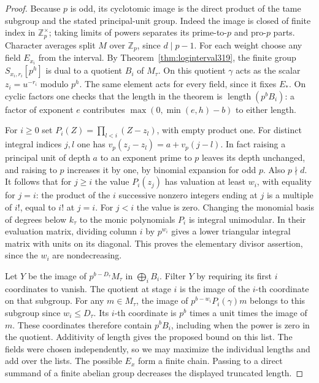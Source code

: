 \documentclass[a4paper,11pt]{article}
\theoremstyle{definition}
\theoremstyle{remark}
\newcommand{\ZZ}{\mathbb Z}\newcommand{\ord}{\operatorname{ord}}
\newcommand{\len}{\operatorname{length}}\newcommand{\Res}{\operatorname*{Res}}
\numberwithin{equation}{section}
\begin{document}
\begin{proof}
Because \(p\) is odd, its cyclotomic image is the direct
product of the tame subgroup and the stated principal-unit
group. Indeed the image is closed of finite index in
\(\ZZ_p^\times\); taking limits of powers separates its
prime-to-\(p\) and pro-\(p\) parts. Character averages split
\(M\) over \(\ZZ_p\), since \(d\mid p-1\).
For each weight choose any field \(E_{x_i}\) from the interval.
By Theorem~\ref{thm:loginterval319}, the finite group
\(S_{x_i,r_i}[p^h]\) is dual to a quotient \(B_i\) of
\(M_\tau\). On this quotient \(\gamma\) acts as the scalar
\(z_i=u^{-r_i}\) modulo \(p^h\). The same element acts for
every field, since it fixes \(E_*\). On cyclic factors one
checks that the length in the theorem is \(\len(p^bB_i)\):
a factor of exponent \(e\) contributes
\(\max(0,\min(e,h)-b)\) to either length.

For \(i\ge0\) set \(P_i(Z)=\prod_{l<i}(Z-z_l)\), with
empty product one. For distinct integral indices \(j,l\)
one has \(v_p(z_j-z_l)=a+v_p(j-l)\).
In fact raising a principal unit of depth \(a\) to an
exponent prime to \(p\) leaves its depth unchanged, and
raising to \(p\) increases it by one, by binomial expansion
for odd \(p\). Also \(p\nmid d\). It follows that for
\(j\ge i\) the value \(P_i(z_j)\) has valuation at least
\(w_i\), with equality for \(j=i\): the product of the
\(i\) successive nonzero integers ending at \(j\) is a
multiple of \(i!\), equal to \(i!\) at \(j=i\).
For \(j<i\) the value is zero. Changing the monomial basis
of degrees below \(k_\tau\) to the monic polynomials \(P_i\)
is integral unimodular. In their evaluation matrix, dividing
column \(i\) by \(p^{w_i}\) gives a lower triangular integral
matrix with units on its diagonal. This proves the elementary
divisor assertion, since the \(w_i\) are nondecreasing.

Let \(Y\) be the image of \(p^{b-D_\tau}M_\tau\) in
\(\bigoplus_i B_i\). Filter \(Y\) by requiring its first
\(i\) coordinates to vanish. The quotient at stage \(i\)
is the image of the \(i\)-th coordinate on that subgroup.
For any \(m\in M_\tau\), the image of
\(p^{b-w_i}P_i(\gamma)m\) belongs to this subgroup since
\(w_i\le D_\tau\). Its \(i\)-th coordinate is \(p^b\)
times a unit times the image of \(m\). These coordinates
therefore contain \(p^b B_i\), including when the power is
zero in the quotient. Additivity of length gives the proposed
bound on this list. The fields were chosen independently,
so we may maximize the individual lengths and add over the
lists. The possible \(E_x\) form a finite chain. Passing
to a direct summand of a finite abelian group decreases the
displayed truncated length.


\end{proof}
\end{document}

